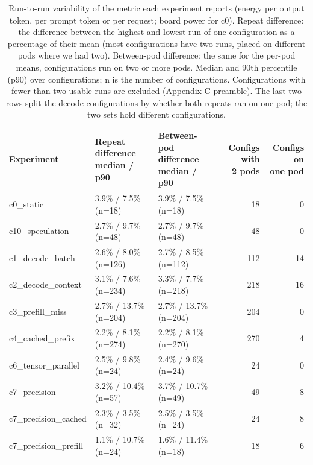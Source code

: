 \begin{table}[t]
\centering
\footnotesize
\setlength{\tabcolsep}{4pt}
\caption{Run-to-run variability of the metric each experiment reports (energy per output token, per prompt token or per request; board power for c0). Repeat difference: the difference between the highest and lowest run of one configuration as a percentage of their mean (most configurations have two runs, placed on different pods where we had two). Between-pod difference: the same for the per-pod means, configurations run on two or more pods. Median and 90th percentile (p90) over configurations; n is the number of configurations. Configurations with fewer than two usable runs are excluded (Appendix C preamble). The last two rows split the decode configurations by whether both repeats ran on one pod; the two sets hold different configurations.}\label{tab:cv}
\begin{tabular}{lllrr}
\toprule
Experiment & \makecell[l]{Repeat\\difference\\median / p90} & \makecell[l]{Between-pod\\difference\\median / p90} & \makecell[r]{Configs with\\2 pods} & \makecell[r]{Configs on\\one pod} \\
\midrule
c0\_static & 3.9\% / 7.5\% (n=18) & 3.9\% / 7.5\% (n=18) & 18 & 0 \\
c10\_speculation & 2.7\% / 9.7\% (n=48) & 2.7\% / 9.7\% (n=48) & 48 & 0 \\
c1\_decode\_batch & 2.6\% / 8.0\% (n=126) & 2.7\% / 8.5\% (n=112) & 112 & 14 \\
c2\_decode\_context & 3.1\% / 7.6\% (n=234) & 3.3\% / 7.7\% (n=218) & 218 & 16 \\
c3\_prefill\_miss & 2.7\% / 13.7\% (n=204) & 2.7\% / 13.7\% (n=204) & 204 & 0 \\
c4\_cached\_prefix & 2.2\% / 8.1\% (n=274) & 2.2\% / 8.1\% (n=270) & 270 & 4 \\
c6\_tensor\_parallel & 2.5\% / 9.8\% (n=24) & 2.4\% / 9.6\% (n=24) & 24 & 0 \\
c7\_precision & 3.2\% / 10.4\% (n=57) & 3.7\% / 10.7\% (n=49) & 49 & 8 \\
c7\_precision\_cached & 2.3\% / 3.5\% (n=32) & 2.5\% / 3.5\% (n=24) & 24 & 8 \\
c7\_precision\_prefill & 1.1\% / 10.7\% (n=24) & 1.6\% / 11.4\% (n=18) & 18 & 6 \\

\end{tabular}
\end{table}
